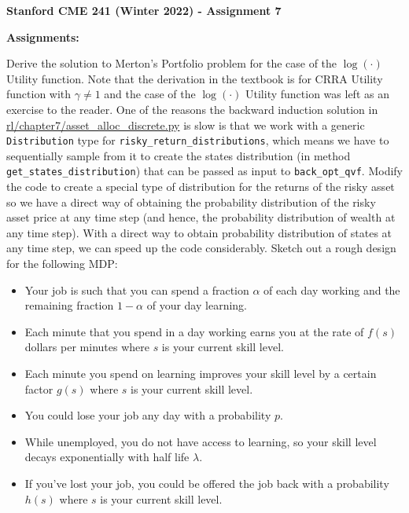 \documentclass[12pt]{exam}
\begin{document}
\begin{center}
{\large {\bf Stanford CME 241 (Winter 2022) - Assignment 7}}
\end{center}
 
{\large{\bf Assignments:}}
\begin{questions}
\question Derive the solution to Merton's Portfolio problem for the case of the $\log(\cdot)$ Utility function. Note that the derivation in the textbook is for CRRA Utility function with $\gamma \neq 1$ and the case of the $\log(\cdot)$ Utility function was left as an exercise to the reader.
 One of the reasons the backward induction solution in \href{https://github.com/TikhonJelvis/RL-book/blob/master/rl/chapter7/asset_alloc_discrete.py}{rl\//chapter7\//asset\_alloc\_discrete.py} is slow is that we work with a generic \lstinline{Distribution} type for \lstinline{risky_return_distributions}, which means we have to sequentially sample from it to create the states distribution (in method \lstinline{get_states_distribution}) that can be passed as input to \lstinline{back_opt_qvf}. Modify the code to create a special type of distribution for the returns of the risky asset so we have a direct way of obtaining the probability distribution of the risky asset price at any time step (and hence, the probability distribution of wealth at any time step). With a direct way to obtain probability distribution of states at any time step, we can speed up the code considerably. 
\question Sketch out a rough design for the following MDP:
\begin{itemize}
\item Your job is such that you can spend a fraction $\alpha$ of each day working and the remaining fraction $1-\alpha$ of your day learning.
\item Each minute that you spend in a day working earns you at the rate of $f(s)$ dollars per minutes where $s$ is your current skill level.
\item Each minute you spend on learning improves your skill level by a certain factor $g(s)$ where $s$ is your current skill level.
\item You could lose your job any day with a probability $p$.
\item While unemployed, you do not have access to learning, so your skill level decays exponentially with half life $\lambda$.
\item If you've lost your job, you could be offered the job back with a probability $h(s)$ where $s$ is your current skill level.
\end{itemize}


\end{questions}
\end{document}
